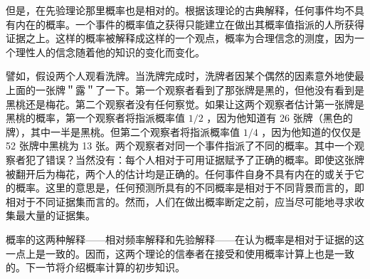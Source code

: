 但是，在先验理论那里概率也是相对的。根据该理论的古典解释，任何事件均不具有内在的概率。一个事件的概率值之获得只能建立在做出其概率值指派的人所获得证据之上。这样的概率被解释成这样的一个观点，概率为合理信念的测度，因为一个理性人的信念随着他的知识的变化而变化。

譬如，假设两个人观看洗牌。当洗牌完成时，洗牌者因某个偶然的因素意外地使最上面的一张牌＂露＂了一下。第一个观察者看到了那张牌是黑的，但他没有看到是黑桃还是梅花。第二个观察者没有任何察觉。如果让这两个观察者估计第一张牌是黑桃的概率，第一个观察者将指派概率值 $1 / 2$ ，因为他知道有 26 张牌（黑色的牌），其中一半是黑桃。但第二个观察者将指派概率值 $1 / 4$ ，因为他知道的仅仅是 52 张牌中黑桃为 13 张。两个观察者对同一个事件指派了不同的概率。其中一个观察者犯了错误？当然没有：每个人相对于可用证据赋予了正确的概率。即使这张牌被翻开后为梅花，两个人的估计均是正确的。任何事件自身不具有内在的或关于它的概率。这里的意思是，任何预测所具有的不同概率是相对于不同背景而言的，即相对于不同证据集而言的。然而，人们在做出概率断定之前，应当尽可能地寻求收集最大量的证据集。

概率的这两种解释——相对频率解释和先验解释——在认为概率是相对于证据的这一点上是一致的。因而，这两个理论的信奉者在接受和使用概率计算上也是一致的。下一节将介绍概率计算的初步知识。 